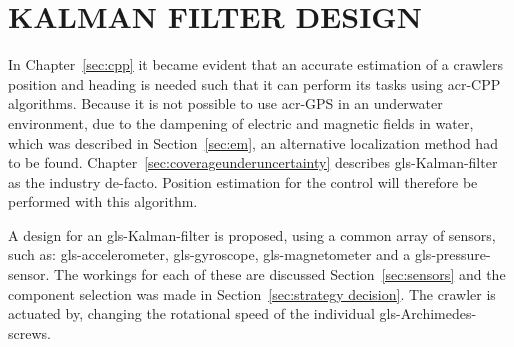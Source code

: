 \section{KALMAN FILTER DESIGN}\label{sec:kalman design}

In Chapter~\ref{sec:cpp} it became evident that an accurate estimation of a crawlers position and heading is needed
such that it can perform its tasks using \gls{acr-CPP} algorithms. Because it is not possible to use \gls{acr-GPS} in an
underwater environment, due to the dampening of electric and magnetic fields in water, which was described in
Section~\ref{sec:em}, an alternative localization method had to be found. Chapter~\ref{sec:coverageunderuncertainty}
describes \gls{gls-Kalman-filter} as the industry de-facto. Position estimation for the control will therefore be
performed with this algorithm.

A design for an \gls{gls-Kalman-filter} is proposed, using a common array of sensors, such as: \gls{gls-accelerometer},
\gls{gls-gyroscope}, \gls{gls-magnetometer} and a \gls{gls-pressure-sensor}. The workings for each of these are
discussed Section~\ref{sec:sensors} and the component selection was made in Section~\ref{sec:strategy decision}. The
crawler is actuated by, changing the rotational speed of the individual \gls{gls-Archimedes-screw}s.

